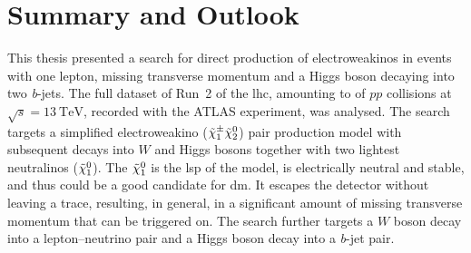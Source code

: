 

\chapter{Summary and Outlook}

\graphicspath{{chapter-summary/Figs/Vector/}{chapter-summary/Figs/}}

This thesis presented a search for direct production of electroweakinos in events with one lepton, missing transverse momentum and a Higgs boson decaying into two \textit{b}-jets.
The full dataset of Run~2 of the \gls{lhc}, amounting to \onethirtynineifb of $pp$ collisions at $\sqrt{s} = \SI{13}{\TeV}$, recorded with the ATLAS experiment, was analysed.
The search targets a simplified electroweakino ($\tilde{\chi}_1^\pm\tilde{\chi}_2^0$) pair production model with subsequent decays into $W$ and Higgs bosons together with two lightest neutralinos ($\tilde{\chi}_1^0$). The $\tilde{\chi}_1^0$ is the \gls{lsp} of the model, is electrically neutral and stable, and thus could be a good candidate for \gls{dm}.
It escapes the detector without leaving a trace, resulting, in general, in a significant amount of missing transverse momentum that can be triggered on.
The search further targets a $W$ boson decay into a lepton--neutrino pair and a Higgs boson decay into a \textit{b}-jet pair.

